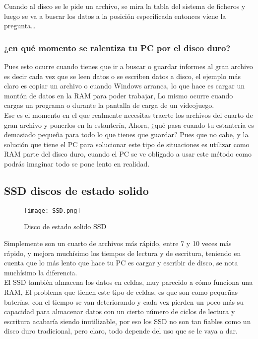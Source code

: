 \documentclass{article}
\begin{document}
Cuando al disco se le pide un archivo, se mira la tabla del sistema de ficheros y luego se va a buscar los datos a la posición especificada entonces viene la pregunta…\\

\subsubsection{¿en qué momento se ralentiza tu PC por el disco duro?}

Pues esto ocurre cuando tienes que ir a buscar o guardar informes al gran archivo es decir cada vez que se leen datos o se escriben datos a disco, el ejemplo más claro es copiar un archivo o cuando Windows arranca, lo que hace es cargar un montón de datos en la RAM para poder trabajar, Lo mismo ocurre cuando cargas un programa o durante la pantalla de carga de un videojuego.\\ 

Ese es el momento en el que realmente necesitas traerte los archivos del cuarto de gran archivo y ponerlos en la estantería, Ahora, ¿qué pasa cuando tu estantería es demasiado pequeña para todo lo que tienes que guardar? Pues que no cabe, y la solución que tiene el PC para solucionar este tipo de situaciones es utilizar como RAM parte del disco duro, cuando el PC se ve obligado a usar este método como podrás imaginar todo se pone lento en realidad.

\subsection{SSD discos de estado solido}

\begin{figure}[h]
\texttt{[image: SSD.png]}
\centering
\caption{Disco de estado solido SSD}
\label{fig:Disco de estado solido SSD}
\end{figure}

Simplemente son un cuarto de archivos más rápido, entre 7 y 10 veces más rápido, y mejora muchísimo los tiempos de lectura y de escritura, teniendo en cuenta que lo más lento que hace tu PC es cargar y escribir de disco, se nota muchísimo la diferencia.\\


El SSD también almacena los datos en celdas, muy parecido a cómo funciona una RAM, El problema que tienen este tipo de celdas, es que son como pequeñas baterías, con el tiempo se van deteriorando y cada vez pierden un poco más su capacidad para almacenar datos con un cierto número de ciclos de lectura y escritura acabaría siendo inutilizable, por eso los SSD no son tan fiables como un disco duro tradicional, pero claro, todo depende del uso que se le vaya a dar.\\
\end{document}
